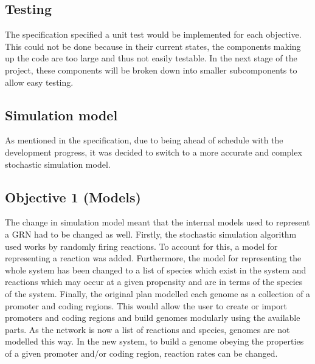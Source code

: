 \documentclass{article}
\begin{document}
	\subsection{Testing} \label{progress-testing}
	The specification specified a unit test would be implemented for each objective. This could not be done because in their current states, the components making up the code are too large and thus not easily testable. In the next stage of the project, these components will be broken down into smaller subcomponents to allow easy testing.
	
	
	\subsection{Simulation model} \label{sim-model}
	As mentioned in the specification, due to being ahead of schedule with the development progress, it was decided to switch to a more accurate and complex stochastic simulation model. 
	
	\subsection{Objective 1 (Models)}  
	The change in simulation model meant that the internal models used to represent a GRN had to be changed as well. Firstly, the stochastic simulation algorithm used works by randomly firing reactions. To account for this, a model for representing a reaction was added. Furthermore, the model for representing the whole system has been changed to a list of species which exist in the system and reactions which may occur at a given propensity and are in terms of the species of the system. Finally, the original plan modelled each genome as a collection of a promoter and coding regions. This would allow the user to create or import promoters and coding regions and build genomes modularly using the available parts. As the network is now a list of reactions and species, genomes are not modelled this way. In the new system, to build a genome obeying the properties of a given promoter and/or coding region, reaction rates can be changed.
	
\end{document}
